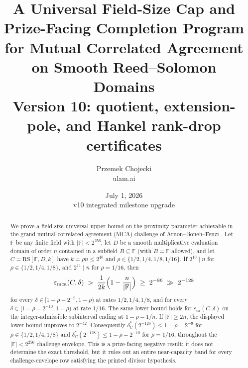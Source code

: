 \documentclass[11pt]{article}
\title{A Universal Field-Size Cap and Prize-Facing Completion Program\\ for Mutual Correlated Agreement on Smooth Reed--Solomon Domains\\[2pt]\large Version 10: quotient, extension-pole, and Hankel rank-drop certificates}
\author{Przemek Chojecki\\ \small ulam.ai}
\date{July 1, 2026\\{\small v10 integrated milestone upgrade}}
\theoremstyle{definition}
\theoremstyle{remark}
\newcommand{\F}{\mathbb{F}}
\newcommand{\B}{B}
\newcommand{\RS}{\mathrm{RS}}
\newcommand{\eca}{\varepsilon_{\mathrm{ca}}}
\newcommand{\emca}{\varepsilon_{\mathrm{mca}}}
\begin{document}
\maketitle

\begin{abstract}
We prove a field-size-universal upper bound on the proximity parameter achievable in the grand mutual-correlated-agreement (MCA) challenge of Arnon--Boneh--Fenzi \cite{ABF26}. Let $\F$ be any finite field with $|\F|<2^{256}$, let $D$ be a smooth multiplicative evaluation domain of order $n$ contained in a subfield $\B\subseteq\F$ (with $\B=\F$ allowed), and let $C=\RS[\F,D,k]$ have $k=\rho n\le2^{40}$ and $\rho\in\{1/2,1/4,1/8,1/16\}$. If $2^{10}\mid n$ for $\rho\in\{1/2,1/4,1/8\}$, and $2^{11}\mid n$ for $\rho=1/16$, then
\[
\emca(C,\delta)
\;>\;\frac{1}{2k}\Bigl(1-\frac n{|\F|}\Bigr)
\;\ge\;2^{-86}\;\gg\;2^{-128}
\]
for every $\delta\in[1-\rho-2^{-9},1-\rho)$ at rates $1/2,1/4,1/8$, and for every $\delta\in[1-\rho-2^{-10},1-\rho)$ at rate $1/16$. The same lower bound holds for $\eca(C,\delta)$ on the integer-admissible subinterval ending at $1-\rho-1/n$. If $|\F|\ge2n$, the displayed lower bound improves to $2^{-42}$. Consequently $\delta^*_C(2^{-128})\le 1-\rho-2^{-9}$ for $\rho\in\{1/2,1/4,1/8\}$ and $\delta^*_C(2^{-128})\le 1-\rho-2^{-10}$ for $\rho=1/16$, throughout the $|\F|<2^{256}$ challenge envelope. This is a prize-facing negative result: it does not determine the exact threshold, but it rules out an entire near-capacity band for every challenge-envelope row satisfying the printed divisor hypothesis.


\end{abstract}
\end{document}
